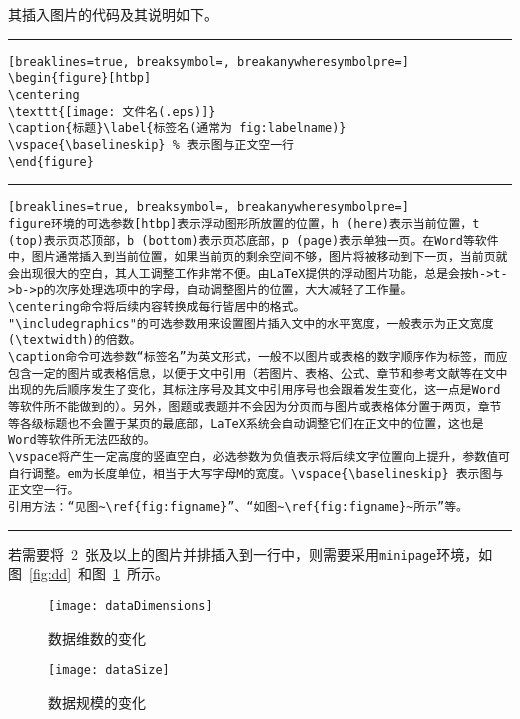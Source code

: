 其插入图片的代码及其说明如下。
\vspace{1em}\noindent\hrule
\begin{Verbatim}[breaklines=true, breaksymbol=, breakanywheresymbolpre=]
\begin{figure}[htbp]
\centering
\texttt{[image: 文件名(.eps)]}
\caption{标题}\label{标签名(通常为 fig:labelname)}
\vspace{\baselineskip} % 表示图与正文空一行
\end{figure}
\end{Verbatim}

\noindent\hrule

\begin{Verbatim}[breaklines=true, breaksymbol=, breakanywheresymbolpre=]
figure环境的可选参数[htbp]表示浮动图形所放置的位置，h (here)表示当前位置，t (top)表示页芯顶部，b (bottom)表示页芯底部，p (page)表示单独一页。在Word等软件中，图片通常插入到当前位置，如果当前页的剩余空间不够，图片将被移动到下一页，当前页就会出现很大的空白，其人工调整工作非常不便。由LaTeX提供的浮动图片功能，总是会按h->t->b->p的次序处理选项中的字母，自动调整图片的位置，大大减轻了工作量。
\centering命令将后续内容转换成每行皆居中的格式。
"\includegraphics"的可选参数用来设置图片插入文中的水平宽度，一般表示为正文宽度(\textwidth)的倍数。
\caption命令可选参数“标签名”为英文形式，一般不以图片或表格的数字顺序作为标签，而应包含一定的图片或表格信息，以便于文中引用（若图片、表格、公式、章节和参考文献等在文中出现的先后顺序发生了变化，其标注序号及其文中引用序号也会跟着发生变化，这一点是Word等软件所不能做到的）。另外，图题或表题并不会因为分页而与图片或表格体分置于两页，章节等各级标题也不会置于某页的最底部，LaTeX系统会自动调整它们在正文中的位置，这也是Word等软件所无法匹敌的。
\vspace将产生一定高度的竖直空白，必选参数为负值表示将后续文字位置向上提升，参数值可自行调整。em为长度单位，相当于大写字母M的宽度。\vspace{\baselineskip} 表示图与正文空一行。
引用方法：“见图~\ref{fig:figname}”、“如图~\ref{fig:figname}~所示”等。
\end{Verbatim}

\noindent\hrule\vspace{1em}

若需要将~2~张及以上的图片并排插入到一行中，则需要采用\verb|minipage|环境，如图~\ref{fig:dd}~和图~\ref{fig:ds}~所示。
\begin{figure}[htbp]
\centering
\begin{minipage}{0.4\textwidth}
\centering
\texttt{[image: dataDimensions]}
\caption{数据维数的变化}\label{fig:dd}
\end{minipage}
\begin{minipage}{0.4\textwidth}
\centering
\texttt{[image: dataSize]}
\caption{数据规模的变化}\label{fig:ds}
\end{minipage}
\vspace{\baselineskip}
\end{figure}

